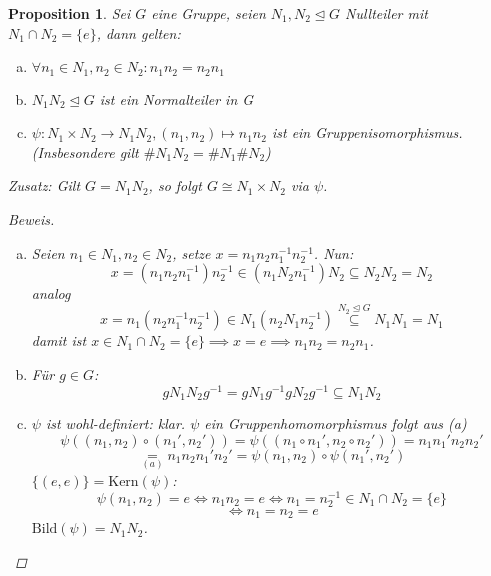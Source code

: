 \documentclass[a4paper]{report}
\theoremstyle{plain}
\newtheorem{prop}[thm]{Proposition}
\theoremstyle{definition}
\begin{document}
\begin{prop}
  Sei $G$ eine Gruppe, seien $N_{1}, N_{2} \trianglelefteq G$ Nullteiler mit $N_{1} \cap N_{2} = \{e\}$, dann gelten:
  \begin{enumerate}[(a)]
    \item $\forall n_{1} \in N_{1}, n_{2} \in N_{2}: n_{1}n_{2} = n_{2}n_{1}$
    \item $N_{1}N_{2} \trianglelefteq G$ ist ein Normalteiler in G
    \item $\psi : N_{1} \times N_{2} \to N_{1}N_{2}, (n_{1},n_{2}) \mapsto n_{1}n_{2}$ ist ein Gruppenisomorphismus. (Insbesondere gilt $\#N_{1}N_{2} = \#N_{1} \#N_{2}$)
  \end{enumerate}
  Zusatz: Gilt $G = N_{1}N_{2}$, so folgt $G \cong N_{1} \times N_{2}$ via $\psi$.
  \begin{proof}[Beweis]
\begin{enumerate}[(a)]
  \item  Seien $n_{1} \in N_{1}, n_{2} \in N_{2}$, setze $x = n_{1}n_{2}n_{1}^{-1}n_{2}^{-1}$.
        Nun: $$x = (n_{1}n_{2}n_{1}^{-1})n_{2}^{-1} \in (n_{1}N_{2}n_{1}^{-1})N_{2} \subseteq N_{2}N_{2} = N_{2}$$
        analog $$x = n_{1}(n_{2}n_{1}^{-1}n_{2}^{-1}) \in N_{1}(n_{2}N_{1}n_{2}^{-1}) \overset{N_{2} \trianglelefteq G}\subseteq N_{1}N_{1} = N_{1}$$
        damit ist $x \in N_{1} \cap N_{2} = \{e\} \implies x = e \implies n_{1}n_{2} = n_{2}n_{1}$.

  \item Für $g \in G$:
        $$gN_{1}N_{2}g^{-1}= gN_{1}g^{-1}gN_{2}g^{-1} \subseteq  N_{1}N_{2}$$

  \item $\psi$ ist wohl-definiert: klar. $\psi$ ein Gruppenhomomorphismus folgt aus (a)
        $$\psi((n_{1}, n_{2}) \circ (n_{1}', n_{2}')) = \psi((n_{1} \circ n_{1}', n_{2} \circ n_{2}')) = n_{1}n_{1}' n_{2}n_{2}'$$
        $$\underset{(a)}= n_{1}n_{2}n_{1}'n_{2}' = \psi(n_{1}, n_{2}) \circ \psi(n_{1}', n_{2}')$$
        $\{(e, e)\} = \mathrm{Kern}(\psi)$:
        $$\psi(n_{1}, n_{2}) = e \iff n_{1}n_{2} = e \iff n_{1} = n_{2}^{-1} \in N_{1}\cap N_{2} = \{e\}$$
        $$\iff n_{1} = n_{2} = e$$
$\mathrm{Bild}(\psi) = N_{1}N_{2}$.
\end{enumerate}
  \end{proof}
\end{prop}
\end{document}

